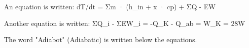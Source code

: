 An equation is written:  
dT/dt = Σm · (h_in + x · cp) + ΣQ - EW  

Another equation is written:  
ΣQ_i - ΣEW_i = -Q_K - Q_ab = W_K = 28W  

The word "Adiabot" (Adiabatic) is written below the equations.